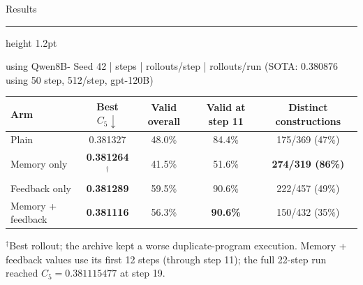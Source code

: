 \documentclass[aspectratio=169]{beamer}
\newcommand{\titlerule}{{\color{titledred}\hrule height 1.2pt}}
\begin{document}
\begin{frame}{Results}
\vspace{-2.35em}
\titlerule
\vspace{0.35em}

\begin{center}
\footnotesize
using Qwen8B- Seed 42 \;| steps \;| rollouts/step \;| rollouts/run (SOTA: 0.380876 using 50 step, 512/step, gpt-120B)
\end{center}

\vspace{0.05em}
\begin{center}
\footnotesize
\renewcommand{\arraystretch}{1.22}
\begin{tabular}{lcccc}
\toprule
Arm & Best $C_5\downarrow$ & Valid overall & Valid at step 11 & Distinct constructions \\
\midrule
Plain & 0.381327 & 48.0\% & 84.4\% & 175/369 \;(47\%) \\
Memory only & \color{titledred}\bfseries 0.381264$^{\dagger}$
            & 41.5\% & 51.6\% & \color{titledred}\bfseries 274/319 \;(86\%) \\
Feedback only & \color{blue!70!black}\bfseries 0.381289
                       & 59.5\% & 90.6\% & 222/457 \;(49\%) \\
Memory + feedback & \color{titledred}\bfseries 0.381116 & 56.3\%
                  & \color{titledred}\bfseries 90.6\% & 150/432 \;(35\%) \\
\bottomrule
\end{tabular}
\end{center}

\vspace{0.35em}
{\scriptsize $^{\dagger}$Best rollout; the archive kept a worse
duplicate-program execution. Memory + feedback values use its first 12 steps
(through step 11); the full 22-step run reached $C_5=0.381115477$ at step 19.}


\end{frame}
\end{document}
